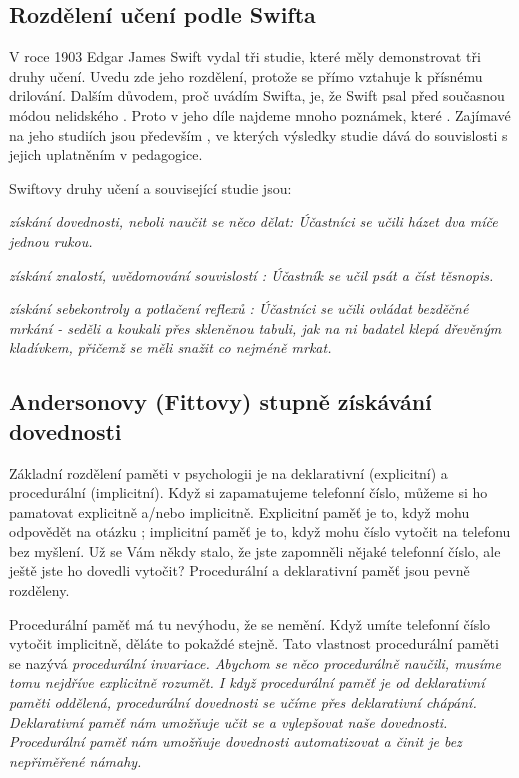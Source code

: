 \subsection{Rozdělení učení podle Swifta}

V roce 1903 Edgar James Swift vydal tři studie, které měly demonstrovat tři druhy učení. Uvedu zde jeho rozdělení, protože se přímo vztahuje k přísnému drilování.  Dalším důvodem, proč uvádím Swifta, je, že Swift psal před současnou módou nelidského .  Proto v jeho díle najdeme mnoho poznámek, které .  Zajímavé na jeho studiích jsou především , ve kterých výsledky studie dává do souvislosti s jejich uplatněním v pedagogice. %

Swiftovy druhy učení a související studie jsou:

\em získání dovednosti, neboli naučit se něco dělat\em : Účastníci se učili házet dva míče jednou rukou. %

\em získání znalostí, uvědomování souvislostí \em : Účastník se učil psát a číst těsnopis.  %

\em získání sebekontroly a potlačení reflexů \em : Účastníci se učili ovládat bezděčné mrkání - seděli a koukali přes skleněnou tabuli, jak na ni badatel klepá dřevěným kladívkem, přičemž se měli snažit co nejméně mrkat.  %

\citep[str.201,224,230,231]{swift1903studies}

\subsection{Andersonovy (Fittovy) stupně získávání dovednosti} %

Základní rozdělení paměti v psychologii je na deklarativní (explicitní) a procedurální (implicitní).  Když si zapamatujeme telefonní číslo, můžeme si ho pamatovat explicitně a/nebo implicitně. Explicitní paměť je to, když mohu odpovědět na otázku ; implicitní paměť je to, když mohu číslo vytočit na telefonu bez myšlení. Už se Vám někdy stalo, že jste zapomněli nějaké telefonní číslo, ale ještě jste ho dovedli vytočit?  Procedurální a deklarativní paměť jsou pevně rozděleny.

Procedurální paměť má tu nevýhodu, že se nemění.  Když umíte telefonní číslo vytočit implicitně, děláte to pokaždé stejně.  Tato vlastnost procedurální paměti se nazývá \em procedurální invariace\em . Abychom se něco procedurálně naučili, musíme tomu nejdříve explicitně rozumět.  I když procedurální paměť je od deklarativní paměti oddělená, procedurální dovednosti se učíme přes deklarativní chápání.  Deklarativní paměť nám umožňuje učit se a vylepšovat naše dovednosti.  Procedurální paměť nám umožňuje dovednosti automatizovat a činit je bez nepřiměřené námahy\citep[str. 105]{robert1994handbook}.

